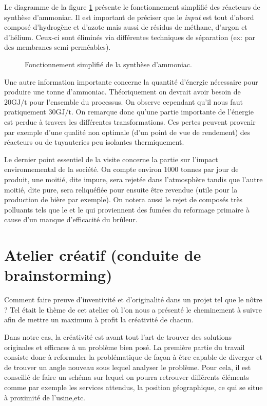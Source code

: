\documentclass[a4paper, oneside, 12pt]{article}
\begin{document}
Le diagramme de la figure \ref{fig:synthese} présente le fonctionnement simplifié 
des réacteurs de synthèse d'ammoniac. Il est important de préciser que le \emph{input}
est tout d'abord composé d'hydrogène et d'azote mais aussi de résidus de méthane, 
d'argon et d'hélium. Ceux-ci sont éliminés via différentes techniques 
de séparation (ex: par des membranes semi-perméables). 

\begin{figure}[h!]
	\begin{center}
		
	\end{center}
	\caption{Fonctionnement simplifié de la synthèse d'ammoniac.}
	\label{fig:synthese}
\end{figure}

Une autre information importante concerne la quantité d'énergie nécessaire pour produire
une tonne d'ammoniac. Théoriquement on devrait avoir besoin de $20 \si{\giga\joule/\tonne}$
pour l'ensemble du processus. On observe cependant qu'il nous faut 
pratiquement $30 \si{\giga\joule/\tonne}$. On remarque donc qu'une partie 
importante de l'énergie est perdue à travers les différentes transformations. 
Ces pertes peuvent provenir par exemple d'une qualité non optimale (d'un point de vue 
de rendement) des réacteurs ou de tuyauteries peu isolantes thermiquement.

Le dernier point essentiel de la visite concerne la partie sur l'impact environnemental 
de la société. On compte environ $1000$ tonnes par jour de  produit, une moitié,
dite impure, sera rejetée dans l'atmosphère tandis que l'autre moitié, dite pure, 
sera reliquéfiée pour ensuite être revendue (utile pour la production de bière par exemple).
On notera aussi le rejet de composés très polluants tels que le  et le  
qui proviennent des fumées du reformage primaire à cause d'un manque d'efficacité
du brûleur.

\section{Atelier créatif (conduite de brainstorming)}

Comment faire preuve d'inventivité et d'originalité dans un projet tel que le nôtre ?
Tel était le thème de cet atelier où l'on nous a présenté le cheminement 
à suivre afin de mettre un maximum à profit la créativité de chacun.

Dans notre cas, la créativité est avant tout l'art de trouver des solutions 
originales et efficaces à un problème bien posé. 
La première partie du travail consiste donc à reformuler la problématique de façon 
à être capable de diverger et de trouver un angle nouveau sous lequel analyser le problème. 
Pour cela, il est conseillé de faire un schéma sur lequel on pourra retrouver différents
éléments comme par exemple les services attendus, la position géographique, 
ce qui se situe à proximité de l’usine,etc.
\end{document}
